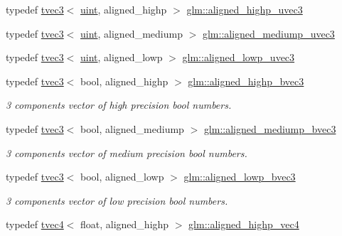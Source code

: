 \begin{DoxyCompactItemize}
\item 
typedef \mbox{\hyperlink{structglm_1_1tvec3}{tvec3}}$<$ \mbox{\hyperlink{group__core__precision_ga4fd29415871152bfb5abd588334147c8}{uint}}, aligned\+\_\+highp $>$ \mbox{\hyperlink{group__gtc__type__aligned_gac7b68f6ca0c6a536c9692bfb885a0006}{glm\+::aligned\+\_\+highp\+\_\+uvec3}}
\item 
typedef \mbox{\hyperlink{structglm_1_1tvec3}{tvec3}}$<$ \mbox{\hyperlink{group__core__precision_ga4fd29415871152bfb5abd588334147c8}{uint}}, aligned\+\_\+mediump $>$ \mbox{\hyperlink{group__gtc__type__aligned_ga7d2ad25929896f2c0fa15eec440b8074}{glm\+::aligned\+\_\+mediump\+\_\+uvec3}}
\item 
typedef \mbox{\hyperlink{structglm_1_1tvec3}{tvec3}}$<$ \mbox{\hyperlink{group__core__precision_ga4fd29415871152bfb5abd588334147c8}{uint}}, aligned\+\_\+lowp $>$ \mbox{\hyperlink{group__gtc__type__aligned_ga3d3b253d6dc1d1ac3b1732f65fd83901}{glm\+::aligned\+\_\+lowp\+\_\+uvec3}}
\item 
typedef \mbox{\hyperlink{structglm_1_1tvec3}{tvec3}}$<$ bool, aligned\+\_\+highp $>$ \mbox{\hyperlink{group__gtc__type__aligned_gadd773554f8ca95a959a269252ad20738}{glm\+::aligned\+\_\+highp\+\_\+bvec3}}
\begin{DoxyCompactList}\small\item\em 3 components vector of high precision bool numbers. \end{DoxyCompactList}\item 
typedef \mbox{\hyperlink{structglm_1_1tvec3}{tvec3}}$<$ bool, aligned\+\_\+mediump $>$ \mbox{\hyperlink{group__gtc__type__aligned_gaf2b80c6765cdb6cd9c4458ad5f0e66a2}{glm\+::aligned\+\_\+mediump\+\_\+bvec3}}
\begin{DoxyCompactList}\small\item\em 3 components vector of medium precision bool numbers. \end{DoxyCompactList}\item 
typedef \mbox{\hyperlink{structglm_1_1tvec3}{tvec3}}$<$ bool, aligned\+\_\+lowp $>$ \mbox{\hyperlink{group__gtc__type__aligned_ga5c8b3197e8ac78252c1b49be19ae0394}{glm\+::aligned\+\_\+lowp\+\_\+bvec3}}
\begin{DoxyCompactList}\small\item\em 3 components vector of low precision bool numbers. \end{DoxyCompactList}\item 
typedef \mbox{\hyperlink{structglm_1_1tvec4}{tvec4}}$<$ float, aligned\+\_\+highp $>$ \mbox{\hyperlink{group__gtc__type__aligned_ga4ec188da13bf0836f9a61b0b2b88425f}{glm\+::aligned\+\_\+highp\+\_\+vec4}}

\end{DoxyCompactItemize}
